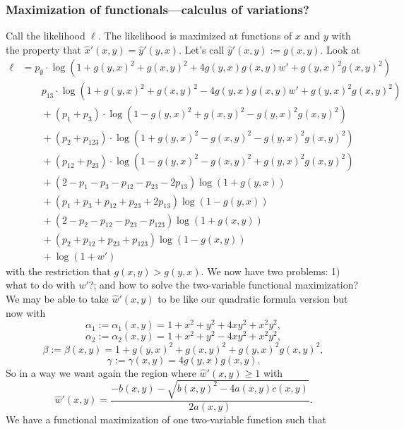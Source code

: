 \subsubsection{Maximization of functionals---calculus of variations?}

Call the likelihood $\ell$.
The likelihood is maximized at functions of $x$ and $y$ with the property that $\hat{x}'(x,y) = \hat{y}'(y,x)$.
Let's call $\hat{y}'(x, y) := g(x, y)$.
Look at
\begin{align*}
    \ell
    &=        p_{\emptyset}  \cdot\log(1+g(y, x)^2+g(x, y)^2+4g(y, x)g(x, y)w'+g(y, x)^2g(x, y)^2) \\
    &\qquad   p_{13}  \cdot\log(1+g(y, x)^2+g(x, y)^2-4g(y, x)g(x, y)w'+g(y, x)^2g(x, y)^2) \\
    &\qquad + (p_{1} + p_{3})          \cdot\log(1-g(y, x)^2+g(x, y)^2-g(y, x)^2g(x, y)^2) \\
    &\qquad + (p_{2} + p_{123})          \cdot\log(1+g(y, x)^2-g(x, y)^2-g(y, x)^2g(x, y)^2) \\
    &\qquad + (p_{12} + p_{23})         \cdot\log(1-g(y, x)^2-g(x, y)^2+g(y, x)^2g(x, y)^2) \\
    &\qquad + (2-p_{1}-p_{3}-p_{12}-p_{23}-2p_{13})\log(1+g(y, x)) \\
    &\qquad + (p_{1}+p_{3}+p_{12}+p_{23}+2p_{13})\log(1-g(y, x)) \\
    &\qquad + (2-p_{2}-p_{12}-p_{23}-p_{123})\log(1+g(x, y)) \\
    &\qquad + (p_{2}+p_{12}+p_{23}+p_{123})\log(1-g(x, y)) \\
    &\qquad + \log(1+w')
\end{align*}
with the restriction that $g(x, y) > g(y, x)$.
We now have two problems: 1) what to do with $w'$?; and how to solve the two-variable functional maximization?
We may be able to take $\hat{w}'(x, y)$ to be like our quadratic formula version but now with 
$$
\alpha_1 := \alpha_1(x, y) = 1+x^2+y^2+4xy^2+x^2y^2,
$$
$$
\alpha_2 := \alpha_2(x, y) = 1+x^2+y^2-4xy^2+x^2y^2,
$$
$$
\beta := \beta(x, y) = 1+g(y, x)^2+g(x, y)^2+g(y, x)^2g(x, y)^2,
$$
$$
\gamma := \gamma(x, y) = 4g(y, x)g(x, y).
$$
So in a way we want again the region where $\hat{w}'(x, y) \ge 1$ with
$$
\hat{w}'(x, y) = \frac{-b(x, y) - \sqrt{b(x, y)^2 - 4a(x, y)c(x, y)}}{2a(x, y)}.
$$
We have a functional maximization of one two-variable function such that
